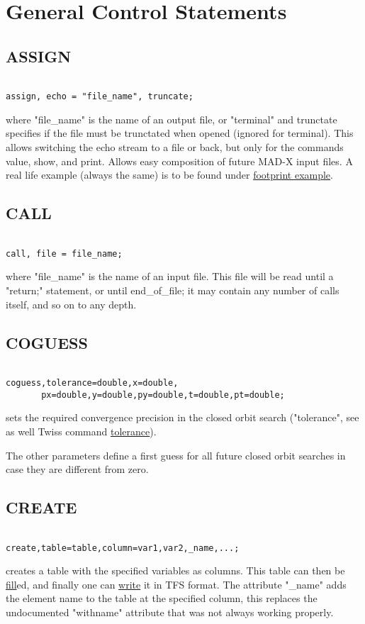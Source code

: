
\section{General Control Statements}

\subsection{ASSIGN}
\begin{verbatim}

assign, echo = "file_name", truncate;
\end{verbatim} 
where "file\_name"  is the name of an output file, or "terminal" and
trunctate specifies if the file must be trunctated when opened (ignored
for terminal). This allows switching the echo stream to a file or back,
but only for the commands value, show, and print. Allows easy
composition of future MAD-X input files. A real life example (always the
same) is to be found under \href{foot.html}{footprint example}.  

\subsection{CALL}
\begin{verbatim}

call, file = file_name;
\end{verbatim} 
where "file\_name"  is the name of an input file. This file will be read
until a "return;" statement, or until end\_of\_file; it may contain any
number of calls itself, and so on to any depth.  


\subsection{COGUESS}
\begin{verbatim}

coguess,tolerance=double,x=double,
       px=double,y=double,py=double,t=double,pt=double;
\end{verbatim} 
sets the required convergence precision in the closed orbit search
("tolerance", see as well Twiss command
\href{../twiss/twiss.html#tolerance}{tolerance}).  

The other parameters define a first guess for all future closed orbit
searches in case they are different from zero.  


\subsection{CREATE}
\begin{verbatim}

create,table=table,column=var1,var2,_name,...;
\end{verbatim} 
creates a table with the specified variables as columns. This table can
then be \hyperlink{fill}{fill}ed, and finally one can
\hyperlink{write}{write} it in TFS format. The attribute "\_name" adds
the element name to the table at the specified column, this replaces the
undocumented "withname" attribute that was not always working properly.  

